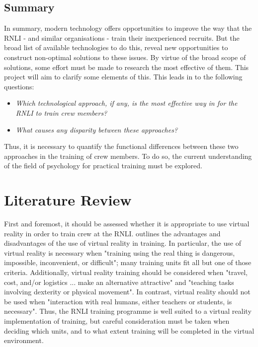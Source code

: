 \documentclass[ %
                    author={Elis Jones},
                supervisor={Dr. Kirsten Cater},
                    degree={BSc},
                     title={The Effect of Presentation Medium on Spatial Cognition},
                  subtitle={in the Virtual Environment},
                      year={2018} ]{dissertation}
\begin{document}
\subsection{Summary}\label{tech-summary}
In summary, modern technology offers opportunities to improve the way that the RNLI - and similar organisations - train their inexperienced recruits. But the broad list of available technologies to do this, reveal new opportunities to construct non-optimal solutions to these issues. By virtue of the broad scope of solutions, some effort must be made to research the most effective of them. This project will aim to clarify some elements of this. This leads in to the following questions:

\begin{itemize}
    \item \textit{Which technological approach, if any, is the most effective way in for the RNLI to train crew members?}
    \item \textit{What causes any disparity between these approaches?}
\end{itemize}

Thus, it is necessary to quantify the functional differences between these two approaches in the training of crew members. To do so, the current understanding of the field of psychology for practical training must be explored.

\section{Literature Review}\label{litreview}
First and foremost, it should be assessed whether it is appropriate to use virtual reality in order to train crew at the RNLI. \cite{Pantelidis2010} outlines the advantages and disadvantages of the use of virtual reality in training. In particular, the use of virtual reality is necessary when "training using the real thing is dangerous, impossible, inconvenient, or difficult"; many training units fit all but one of those criteria. Additionally, virtual reality training should be considered when "travel, cost, and/or logistics ... make an alternative attractive" and "teaching tasks involving dexterity or physical movement". In contrast, virtual reality should not be used when "interaction with real humans, either teachers or students, is necessary". Thus, the RNLI training programme is well suited to a virtual reality implementation of training, but careful consideration must be taken when deciding which units, and to what extent training will be completed in the virtual environment. 
\end{document}
